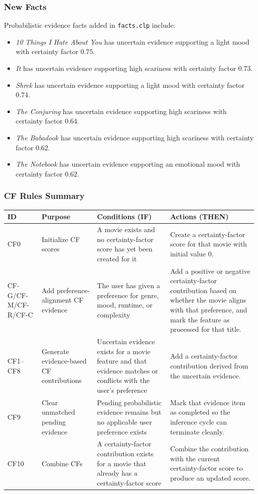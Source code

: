 \documentclass[11pt]{article}
\begin{document}
\subsubsection{New Facts}
Probabilistic evidence facts added in \texttt{facts.clp} include:
\begin{itemize}
  \item \textit{10 Things I Hate About You} has uncertain evidence supporting a light mood with certainty factor $0.75$.
  \item \textit{It} has uncertain evidence supporting high scariness with certainty factor $0.73$.
  \item \textit{Shrek} has uncertain evidence supporting a light mood with certainty factor $0.74$.
  \item \textit{The Conjuring} has uncertain evidence supporting high scariness with certainty factor $0.64$.
  \item \textit{The Babadook} has uncertain evidence supporting high scariness with certainty factor $0.62$.
  \item \textit{The Notebook} has uncertain evidence supporting an emotional mood with certainty factor $0.62$.
\end{itemize}

\subsubsection{CF Rules Summary}
\begingroup
\small
\setlength{\tabcolsep}{4pt}
\renewcommand{\arraystretch}{1.08}
\begin{tabular}{@{}L{0.11\textwidth} L{0.27\textwidth} L{0.30\textwidth} L{0.27\textwidth}@{}}
\toprule
\textbf{ID} & \textbf{Purpose} & \textbf{Conditions (IF)} & \textbf{Actions (THEN)} \\
\midrule
CF0 & Initialize CF scores &
A movie exists and no certainty-factor score has yet been created for it &
Create a certainty-factor score for that movie with initial value $0$. \\
CF-G/CF-M/CF-R/CF-C & Add preference-alignment CF evidence &
The user has given a preference for genre, mood, runtime, or complexity &
Add a positive or negative certainty-factor contribution based on whether the movie aligns with that preference, and mark the feature as processed for that title. \\
CF1--CF8 & Generate evidence-based CF contributions &
Uncertain evidence exists for a movie feature and that evidence matches or conflicts with the user's preference &
Add a certainty-factor contribution derived from the uncertain evidence. \\
CF9 & Clear unmatched pending evidence &
Pending probabilistic evidence remains but no applicable user preference exists &
Mark that evidence item as completed so the inference cycle can terminate cleanly. \\
CF10 & Combine CFs &
A certainty-factor contribution exists for a movie that already has a certainty-factor score &
Combine the contribution with the current certainty-factor score to produce an updated score. \\
\bottomrule
\end{tabular}
\endgroup
\end{document}
